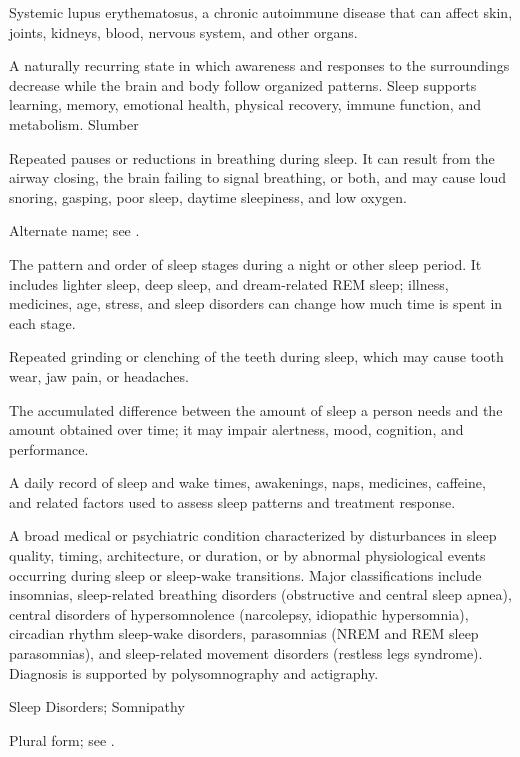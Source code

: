  Systemic lupus erythematosus, a chronic autoimmune disease that can affect skin, joints, kidneys, blood, nervous system, and other organs.

 A naturally recurring state in which awareness and responses to the surroundings decrease while the brain and body follow organized patterns. Sleep supports learning, memory, emotional health, physical recovery, immune function, and metabolism.
\synonyms
Slumber

 Repeated pauses or reductions in breathing during sleep. It can result from the airway closing, the brain failing to signal breathing, or both, and may cause loud snoring, gasping, poor sleep, daytime sleepiness, and low oxygen.

 Alternate name; see .

 The pattern and order of sleep stages during a night or other sleep period. It includes lighter sleep, deep sleep, and dream-related REM sleep; illness, medicines, age, stress, and sleep disorders can change how much time is spent in each stage.

 Repeated grinding or clenching of the teeth during sleep, which may cause tooth wear, jaw pain, or headaches.

 The accumulated difference between the amount of sleep a person needs and the amount obtained over time; it may impair alertness, mood, cognition, and performance.

 A daily record of sleep and wake times, awakenings, naps, medicines, caffeine, and related factors used to assess sleep patterns and treatment response.

 A broad medical or psychiatric condition characterized by disturbances in sleep quality, timing, architecture, or duration, or by abnormal physiological events occurring during sleep or sleep-wake transitions. Major classifications include insomnias, sleep-related breathing disorders (obstructive and central sleep apnea), central disorders of hypersomnolence (narcolepsy, idiopathic hypersomnia), circadian rhythm sleep-wake disorders, parasomnias (NREM and REM sleep parasomnias), and sleep-related movement disorders (restless legs syndrome). Diagnosis is supported by polysomnography and actigraphy.

\synonyms
Sleep Disorders; Somnipathy

 Plural form; see .

